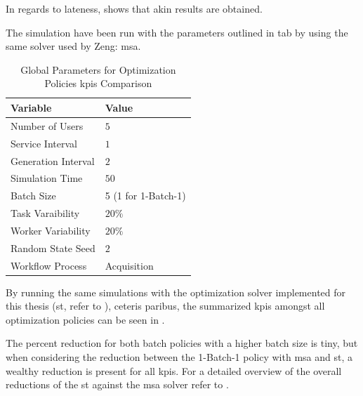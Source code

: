 \documentclass{seal_thesis}
\begin{document}
In regards to lateness,  shows that akin results are obtained.


The simulation have been run with the parameters outlined in tab by using the same solver used by Zeng: \gls{msa}.

\begin{table}[!ht]
\centering
\begin{tabular}{@{}ll@{}}
\toprule
Variable            & Value     \\ \midrule
Number of Users     & $5$                 \\
Service Interval    & $1$              \\
Generation Interval & $2$                 \\
Simulation Time     & $50$              \\
Batch Size          & 5 (1 for 1-Batch-1)               \\
Task Varaibility    & $20\%$             \\
Worker Variability  & $20\%$              \\
Random State Seed   & $2$                 \\
Workflow Process    & Acquisition       \\ \bottomrule
\end{tabular}
\caption{Global Parameters for Optimization Policies \glspl{kpi} Comparison}
\label{tab:global_parameters_kpis_comp}
\end{table}

By running the same simulations with the optimization solver implemented for this thesis (\ie \gls{st}, refer to ), ceteris paribus, the summarized \glspl{kpi} amongst all optimization policies can be seen in .


The percent reduction for both batch policies with a higher batch size is tiny, but when considering the reduction between the 1-Batch-1 policy with \gls{msa} and \gls{st}, a wealthy reduction is present for all \glspl{kpi}. For a detailed overview of the overall reductions of the \gls{st} against the \gls{msa} solver refer to .
\end{document}
